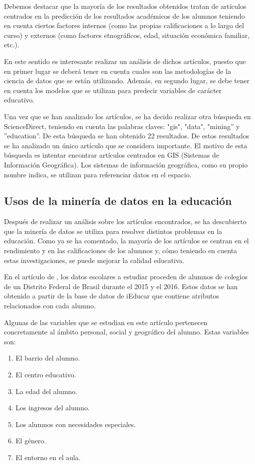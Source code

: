Debemos destacar que la mayoría de los resultados obtenidos tratan de artículos centrados en la predicción de los resultados académicos de los alumnos teniendo en cuenta ciertos factores internos (como las propias calificaciones a lo largo del curso) y externos (como factores etnográficos, edad, situación económica familiar, etc.).

En este sentido es interesante realizar un análisis de dichos artículos, puesto que en primer lugar se deberá tener en cuenta cuales son las metodologías de la ciencia de datos que se están utilizando. Además, en segundo lugar, se debe tener en cuenta los modelos que se utilizan para predecir variables de carácter educativo. 

Una vez que se han analizado los artículos, se ha decido realizar otra búsqueda en ScienceDirect, teniendo en cuenta las palabras claves: "gis", "data", "mining'' y ''education''. De esta búsqueda se han obtenido 22 resultados. De estos resultados se ha analizado un único artículo que se considera importante. El motivo de esta búsqueda es intentar encontrar artículos centrados en GIS (Sistemas de Información Geográfica). Los sistemas de información geográfica, como su propio nombre indica, se utilizan para referenciar datos en el espacio. 

\subsection{Usos de la minería de datos en la educación}
Después de realizar un análisis sobre los artículos encontrados, se ha descubierto que la minería de datos se utiliza para resolver distintos problemas en la educación. Como ya se ha comentado, la mayoría de los artículos se centran en el rendimiento y en las calificaciones de los alumnos y, cómo teniendo en cuenta estas investigaciones, se puede mejorar la calidad educativa.

En el artículo de , los datos escolares a estudiar proceden de alumnos de colegios de un Distrito Federal de Brasil durante el 2015 y el 2016. Estos datos se han obtenido a partir de la base de datos de iEducar que contiene atributos relacionados con cada alumno. 

Algunas de las variables que se estudian en este artículo pertenecen concretamente al ámbito personal, social y geográfico del alumno. Estas variables son:
\begin{multicols}{2}
\begin{enumerate}[itemsep=0mm]
\item El barrio del alumno.
\item El centro educativo.
\item La edad del alumno.
\item Los ingresos del alumno.
\item Los alumnos con necesidades especiales.
\item El género. 
\item El entorno en el aula.
\end{enumerate}
\end{multicols}



